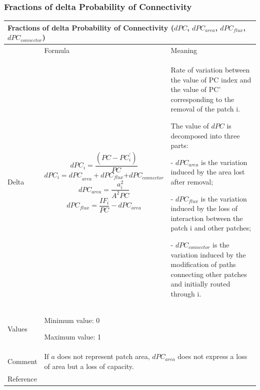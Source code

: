 \documentclass{article}
\begin{document}
\subsubsection{Fractions of delta Probability of Connectivity}
\label{metric_dPC}
\begin{table}[H]
\begin{tabular}{|m{2.4919999cm}|m{5.229cm}m{7.924cm}|}
\hline
\multicolumn{3}{|m{16.044998cm}|}{Fractions of delta Probability of
Connectivity ($dPC$, $dPC_{area}$, $dPC_{flux}$, $dPC_{connector}$)}\\\hline
 &
\multicolumn{1}{m{5.229cm}|}{Formula} &
Meaning\\\hline
Delta &
\multicolumn{1}{m{5.229cm}|}{\begin{equation*}
{\mathit{dPC}}_{i}=\frac{(\mathit{PC}-{\mathit{PC}}_{i}^{'})}{\mathit{PC}}
\end{equation*}
\begin{equation*}
{{\mathit{dPC}}_{i}=\mathit{dPC}}_{\mathit{area}}+{\mathit{dPC}}_{\mathit{flux}}{+\mathit{dPC}}_{\mathit{connector}}
\end{equation*}
\begin{equation*}
{\mathit{dPC}}_{\mathit{area}}=\frac{{a}_{i}^{2}}{{A}^{2}\mathit{PC}}
\end{equation*}
\begin{equation*}
{dPC}_{flux}=\frac{{IF}_{i}}{PC}-{dPC}_{area}
\end{equation*}
} &
Rate of variation between the value of PC index and the value of PC’
corresponding to the removal of the patch i.

The value of $dPC$ is decomposed into three parts:

{}- $dPC_{area}$ is the variation induced by the area lost after removal;

{}- $dPC_{flux}$ is the variation induced by the loss of interaction between
the patch i and other patches;

{}- $dPC_{connector}$ is the variation induced by the modification of paths
connecting other patches and initially routed through i.~\\\hline
Values &
\multicolumn{2}{m{13.353cm}|}{
Minimum value: 0

Maximum value: 1
}\\\hline
Comment &
\multicolumn{2}{m{13.353cm}|}{

If $a$ does not represent patch area, $dPC_{area}$ does not express a loss of area but a loss of capacity.

}\\\hline
Reference &
\multicolumn{2}{m{13.353cm}|}{\cite{Saura2010}}\\\hline
\end{tabular}
\end{table}
\end{document}
